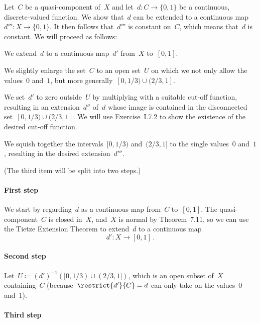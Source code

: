 Let~$C$ be a quasi-component of~$X$ and let~$d \colon C \to \{ 0, 1 \}$ be a continuous, discrete-valued function.
We show that~$d$ can be extended to a continuous map~$d''' \colon X \to \{ 0, 1 \}$.
It then follows that~$d'''$ is constant on~$C$, which means that~$d$ is constant.
We will proceed as follows:
\begin{enumerate*}

	\item
		We extend~$d$ to a continuous map~$d'$ from~$X$ to~$[0, 1]$.

	\item
		We slightly enlarge the set~$C$ to an open set~$U$ on which we not only allow the values~$0$ and~$1$, but more generally~$[0, 1/3) ∪ (2/3, 1]$.

	\item
		We set~$d'$ to zero outside~$U$ by multiplying with a suitable cut-off function, resulting in an extension~$d''$ of~$d$ whose image is contained in the disconnected set~$[0, 1/3) ∪ (2/3, 1]$.
		We will use Exercise~I.7.2 to show the existence of the desired cut-off function.

	\item
		We squish together the intervals~$[0, 1/3)$ and~$(2/3, 1]$ to the single values~$0$ and~$1$, resulting in the desired extension~$d'''$.

\end{enumerate*}
(The third item will be split into two steps.)

\paragraph{First step}

We start by regarding~$d$ as a continuous map from~$C$ to~$[0, 1]$.
The quasi-component~$C$ is closed in~$X$, and~$X$ is normal by Theorem~7.11, so we can use the Tietze Extension Theorem to extend~$d$ to a continuous map
\[
	d' \colon X \to [0, 1] \,.
\]

\paragraph{Second step}

Let~$U ≔ (d')^{-1}([0, 1/3) ∪ (2/3, 1])$, which is an open subset of~$X$ containing~$C$ (because~$\restrict{d'}{C} = d$ can only take on the values~$0$ and~$1$).

\paragraph{Third step}

